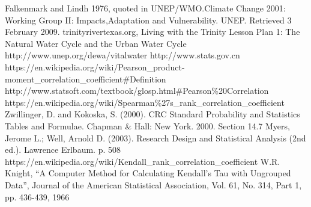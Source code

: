 \begin{thebibliography}{99}
   {Falkenmark and Lindh 1976, quoted in UNEP/WMO.Climate Change 2001: Working Group II: Impacts,Adaptation and Vulnerability. UNEP. Retrieved 3 February 2009.}
   trinityrivertexas.org, Living with the Trinity Lesson Plan 1: The Natural Water Cycle and the Urban Water Cycle
   http://www.unep.org/dewa/vitalwater
   http://www.stats.gov.cn
   https://en.wikipedia.org/wiki/Pearson\_product-moment\_correlation\_coefficient\#Definition
   http://www.statsoft.com/textbook/glosp.html\#Pearson\%20Correlation
   https://en.wikipedia.org/wiki/Spearman\%27s\_rank\_correlation\_coefficient
   Zwillinger, D. and Kokoska, S. (2000). CRC Standard Probability and Statistics Tables and Formulae. Chapman \& Hall: New York. 2000. Section 14.7
   Myers, Jerome L.; Well, Arnold D. (2003). Research Design and Statistical Analysis (2nd ed.). Lawrence Erlbaum. p. 508
   https://en.wikipedia.org/wiki/Kendall\_rank\_correlation\_coefficient
   W.R. Knight, “A Computer Method for Calculating Kendall’s Tau with Ungrouped Data”, Journal of the American Statistical Association, Vol. 61, No. 314, Part 1, pp. 436-439, 1966

\end{thebibliography}

